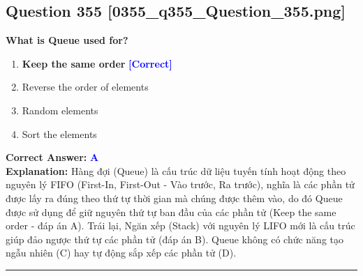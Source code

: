\documentclass[11pt,a4paper]{article}
\begin{document}
\begin{minipage}{\textwidth}
\subsection*{Question 355 \quad \footnotesize{[0355\_q355\_Question\_355.png]}}
\noindent \textbf{What is Queue used for?}

\begin{enumerate}[label=\Alph*.]
    \item \textbf{Keep the same order} \hfill \textcolor{blue}{\textbf{[Correct]}}
    \item Reverse the order of elements
    \item Random elements
    \item Sort the elements
\end{enumerate}

\noindent \textbf{Correct Answer:} \textcolor{blue}{\textbf{A}} \\[2pt]
\noindent \textbf{Explanation:} Hàng đợi (Queue) là cấu trúc dữ liệu tuyến tính hoạt động theo nguyên lý FIFO (First-In, First-Out - Vào trước, Ra trước), nghĩa là các phần tử được lấy ra đúng theo thứ tự thời gian mà chúng được thêm vào, do đó Queue được sử dụng để giữ nguyên thứ tự ban đầu của các phần tử (Keep the same order - đáp án A). Trái lại, Ngăn xếp (Stack) với nguyên lý LIFO mới là cấu trúc giúp đảo ngược thứ tự các phần tử (đáp án B). Queue không có chức năng tạo ngẫu nhiên (C) hay tự động sắp xếp các phần tử (D).

\par\vspace{0.3cm}
\hrule
\vspace{0.3cm}
\end{minipage}
\end{document}
